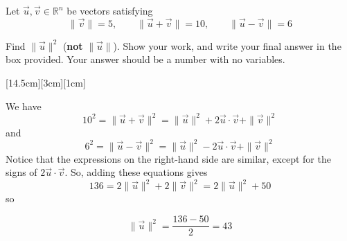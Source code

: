 \documentclass[11pt]{article}
\begin{document}
\begin{prob}[(8 pts)]
Let $\vec u,\vec v\in\mathbb R^n$ be vectors satisfying
\[
\|\vec v\|=5,\qquad \|\vec u+\vec v\|=10,\qquad \|\vec u-\vec v\|=6
\]

Find $\lVert \vec u \rVert^2$ (\textbf{not} $\lVert \vec u \rVert$). Show your work, and write your final answer in the box provided. Your answer should be a number with no variables.

[14.5cm][3cm][1cm]

\begin{solution}
We have
\[
10^2=\|\vec u+\vec v\|^2=\|\vec u\|^2+2\vec u\cdot\vec v+\|\vec v\|^2
\]
and
\[
6^2=\|\vec u-\vec v\|^2=\|\vec u\|^2-2\vec u\cdot\vec v+\|\vec v\|^2
\]
Notice that the expressions on the right-hand side are similar, except for the signs of $2 \vec u \cdot \vec v$. So, adding these equations gives
\[
136=2\|\vec u\|^2+2\|\vec v\|^2=2\|\vec u\|^2+50
\]
so

$$\lVert \vec u \rVert^2 = \frac{136 - 50}{2} = \boxed{43}$$
\end{solution}








\end{prob}
\end{document}
